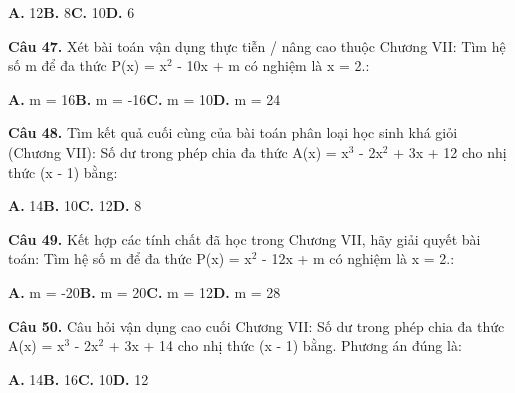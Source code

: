 \documentclass[11pt,a4paper]{article}
\begin{document}
\hspace*{1.5em}\textbf{A.} 12\quad\quad \textbf{B.} 8\quad\quad \textbf{C.} 10\quad\quad \textbf{D.} 6\par\vspace{2pt}
\textbf{\color{primary} Câu 47.} Xét bài toán vận dụng thực tiễn / nâng cao thuộc Chương VII: Tìm hệ số m để đa thức P(x) = x$^2$ - 10x + m có nghiệm là x = 2.:\par
\hspace*{1.5em}\textbf{A.} m = 16\quad\quad \textbf{B.} m = -16\quad\quad \textbf{C.} m = 10\quad\quad \textbf{D.} m = 24\par\vspace{2pt}
\textbf{\color{primary} Câu 48.} Tìm kết quả cuối cùng của bài toán phân loại học sinh khá giỏi (Chương VII): Số dư trong phép chia đa thức A(x) = x$^3$ - 2x$^2$ + 3x + 12 cho nhị thức (x - 1) bằng:\par
\hspace*{1.5em}\textbf{A.} 14\quad\quad \textbf{B.} 10\quad\quad \textbf{C.} 12\quad\quad \textbf{D.} 8\par\vspace{2pt}
\textbf{\color{primary} Câu 49.} Kết hợp các tính chất đã học trong Chương VII, hãy giải quyết bài toán: Tìm hệ số m để đa thức P(x) = x$^2$ - 12x + m có nghiệm là x = 2.:\par
\hspace*{1.5em}\textbf{A.} m = -20\quad\quad \textbf{B.} m = 20\quad\quad \textbf{C.} m = 12\quad\quad \textbf{D.} m = 28\par\vspace{2pt}
\textbf{\color{primary} Câu 50.} Câu hỏi vận dụng cao cuối Chương VII: Số dư trong phép chia đa thức A(x) = x$^3$ - 2x$^2$ + 3x + 14 cho nhị thức (x - 1) bằng. Phương án đúng là:\par
\hspace*{1.5em}\textbf{A.} 14\quad\quad \textbf{B.} 16\quad\quad \textbf{C.} 10\quad\quad \textbf{D.} 12\par\vspace{2pt}
\end{document}
